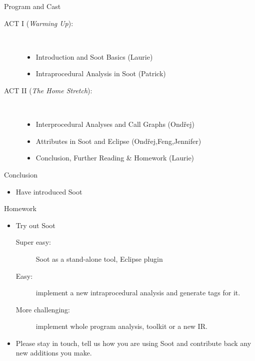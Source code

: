 \begin{slide}{Program and Cast}
\begin{description}
\item[ACT I ({\em Warming Up}):] \hspace{1in} \\
\begin{itemize}
\item Introduction and Soot Basics {\blue (Laurie)}
\item Intraprocedural Analysis in Soot {\blue (Patrick)}
\end{itemize}
\item[ACT II ({\em The Home Stretch}):] \hspace{1in} \\
\begin{itemize}
\item Interprocedural Analyses and Call Graphs {\blue (Ond\v{r}ej)}
\item Attributes in Soot and Eclipse {\blue (Ond\v{r}ej,Feng,Jennifer)}
\item {\red Conclusion, Further Reading \& Homework {\blue (Laurie)}}
\end{itemize}
\end{description}
\end{slide}

\begin{slide}{Conclusion}
\begin{itemize}
\item Have introduced Soot 
\end{itemize}
\end{slide}

\begin{slide}{Homework}
\begin{itemize}
\item Try out Soot
\begin{description}
\item[Super easy:]  Soot as a stand-alone tool,  Eclipse plugin
\item [Easy:]  implement a new intraprocedural analysis and
                 generate tags for it.  
\item [More challenging:]  implement whole program analysis,  toolkit or a
new IR.
\end{description}

\item Please stay in touch, tell us how you are using Soot and
contribute back any new additions you make.
\end{itemize}
\end{slide}

